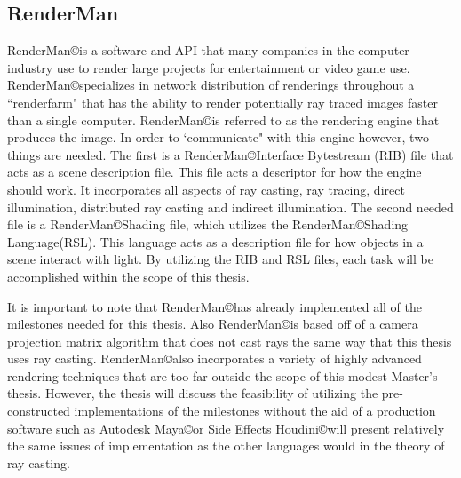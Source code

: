 \subsection{RenderMan}
\label{sub:RenderMan}
RenderMan\copyright\space is a software and API that many companies in the computer industry use to render large projects for entertainment or video game use.  RenderMan\copyright\space specializes in network distribution of renderings throughout a ``renderfarm" that has the ability to render potentially ray traced images faster than a single computer.  RenderMan\copyright\space is referred to as the rendering engine that produces the image.  In order to `communicate" with this engine however, two things are needed.  The first is a RenderMan\copyright\space Interface Bytestream (RIB) file that acts as a scene description file.  This file acts a descriptor for how the engine should work.  It incorporates all aspects of ray casting, ray tracing, direct illumination, distributed ray casting and indirect illumination.  The second needed file is a RenderMan\copyright\space Shading file, which utilizes the RenderMan\copyright\space Shading Language(RSL).  This language acts as a description file for how objects in a scene interact with light.  By utilizing the RIB and RSL files, each task will be accomplished within the scope of this thesis.

It is important to note that RenderMan\copyright\space has already implemented all of the milestones needed for this thesis.  Also RenderMan\copyright\space is based off of a camera projection matrix algorithm that does not cast rays the same way that this thesis uses ray casting.  RenderMan\copyright\space also incorporates a variety of highly advanced rendering techniques that are too far outside the scope of this modest Master's thesis.  However, the thesis will discuss the feasibility of utilizing the pre-constructed implementations of the milestones without the aid of a production software such as Autodesk Maya\copyright\space or  Side Effects Houdini\copyright\space will present relatively the same issues of implementation as the other languages would in the theory of ray casting. 